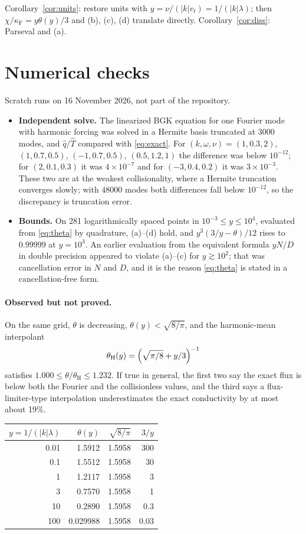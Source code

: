 \documentclass[11pt]{article}
\newcommand{\vt}{v_t}
\theoremstyle{remark}
\begin{document}
Corollary~\ref{cor:units}: restore units with $y = \nu/(|k|\vt) = 1/(|k|\lambda)$;
then $\chi/\kappa_{\mathrm F} = y\theta(y)/3$ and (b), (c), (d) translate
directly. Corollary~\ref{cor:diss}: Parseval and (a).

\section{Numerical checks}

Scratch runs on 16 November 2026, not part of the repository.
\begin{itemize}
  \item \textbf{Independent solve.} The linearized BGK equation for one
    Fourier mode with harmonic forcing was solved in a Hermite basis
    truncated at 3000 modes, and $\hat q/\hat T$ compared with
    \eqref{eq:exact}. For $(k,\omega,\nu) = (1,0.3,2)$, $(1,0.7,0.5)$,
    $(-1,0.7,0.5)$, $(0.5,1.2,1)$ the difference was below $10^{-12}$; for
    $(2,0.1,0.3)$ it was $4\times10^{-7}$ and for $(-3,0.4,0.2)$ it was
    $3\times10^{-3}$. These two are at the weakest collisionality, where a
    Hermite truncation converges slowly; with $48000$ modes both differences
    fall below $10^{-12}$, so the discrepancy is truncation error.
  \item \textbf{Bounds.} On 281 logarithmically spaced points in
    $10^{-3}\le y\le10^4$, evaluated from \eqref{eq:theta} by quadrature,
    (a)--(d) hold, and $y^3(3/y-\theta)/12$ rises to $0.99999$ at $y=10^3$.
    An earlier evaluation from the equivalent formula $yN/D$ in double
    precision appeared to violate (a)--(c) for $y\gtrsim10^2$; that was
    cancellation error in $N$ and $D$, and it is the reason
    \eqref{eq:theta} is stated in a cancellation-free form.
\end{itemize}

\paragraph{Observed but not proved.} On the same grid, $\theta$ is
decreasing, $\theta(y)<\sqrt{8/\pi}$, and the harmonic-mean interpolant
\[
  \theta_{\mathrm H}(y) = \Bigl(\sqrt{\pi/8} + y/3\Bigr)^{-1}
\]
satisfies $1.000\le\theta/\theta_{\mathrm H}\le1.232$. If true in general,
the first two say the exact flux is below both the Fourier and the
collisionless values, and the third says a flux-limiter-type interpolation
underestimates the exact conductivity by at most about 19\%.

\begin{center}
\begin{tabular}{rrrr}
  $y = 1/(|k|\lambda)$ & $\theta(y)$ & $\sqrt{8/\pi}$ & $3/y$ \\ \hline
  0.01 & 1.5912 & 1.5958 & 300 \\
  0.1 & 1.5512 & 1.5958 & 30 \\
  1 & 1.2117 & 1.5958 & 3 \\
  3 & 0.7570 & 1.5958 & 1 \\
  10 & 0.2890 & 1.5958 & 0.3 \\
  100 & 0.029988 & 1.5958 & 0.03 \\
\end{tabular}
\end{center}
\end{document}
